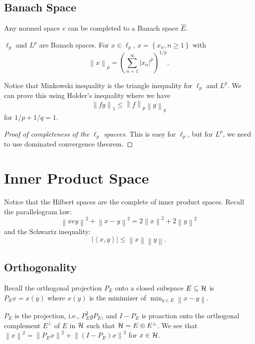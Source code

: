 \subsection{Banach Space}
Any normed space \(e\) can be completed to a Banach space \(\hat{E} \).

\begin{eg}
	\(\ell _p\) and \(L^p\) are Banach spaces. For \(x\in \ell _p\), \(x= \left\{ x_n, n\geq 1 \right\} \) with
	\[
		\left\lVert x\right\rVert _p = \left( \sum_{n=1} ^{\infty} \left\vert x_n \right\vert ^p \right) ^{1 / p}.
	\]
\end{eg}

Notice that Minkowski inequality is the triangle inequality for \(\ell _p\) and \(L^p\). We can prove this using Holder's inequality where we have
\[
	\left\lVert fg\right\rVert _1 \leq \left\lVert f\right\rVert _p \left\lVert g\right\rVert _q
\]
for \(1 / p + 1 / q = 1\).

\begin{proof}[Proof of completeness of the \(\ell _p\) spacees]
	This is easy for \(\ell _p\), but for \(L^p\), we need to use dominated convergence theorem.
\end{proof}

\section{Inner Product Space}
Notice that the Hilbert spaces are the complete of inner product spaces. Recall the parallelogram law:
\[
	\left\lVert x e y\right\rVert ^{2} + \left\lVert x - y\right\rVert ^{2} = 2\left\lVert x\right\rVert ^{2} + 2 \left\lVert y\right\rVert ^{2}
\]
and the Schwartz inequality:
\[
	\left\vert \left\langle x, y \right\rangle  \right\vert \leq \left\lVert x\right\rVert \left\lVert y\right\rVert.
\]

\subsection{Orthogonality}
Recall the orthogonal projection \(P_E\) onto a closed subspace \(E \subseteq \mathcal{\MakeUppercase{h}} \) is \(P_E x = x(y)\) where \(x(y)\) is the minimizer of \(\min _{y\in E} \left\lVert x - y\right\rVert \).

\begin{remark}
	\(P_E\) is the projection, i.e., \(P_E ^{2} g P_E\), and \(I-P_E\) is proaction onto the orthogonal complement \(E^\perp\) of \(E\) in \(\mathcal{\MakeUppercase{h}} \) such that \(\mathcal{\MakeUppercase{h}} = E \oplus E^{\perp} \). We see that \(\left\lVert x\right\rVert ^{2} = \left\lVert P_E x\right\rVert ^{2} + \left\lVert (I - P_E)x\right\rVert ^{2}\) for \(x\in \mathcal{\MakeUppercase{h}} \).
\end{remark}

